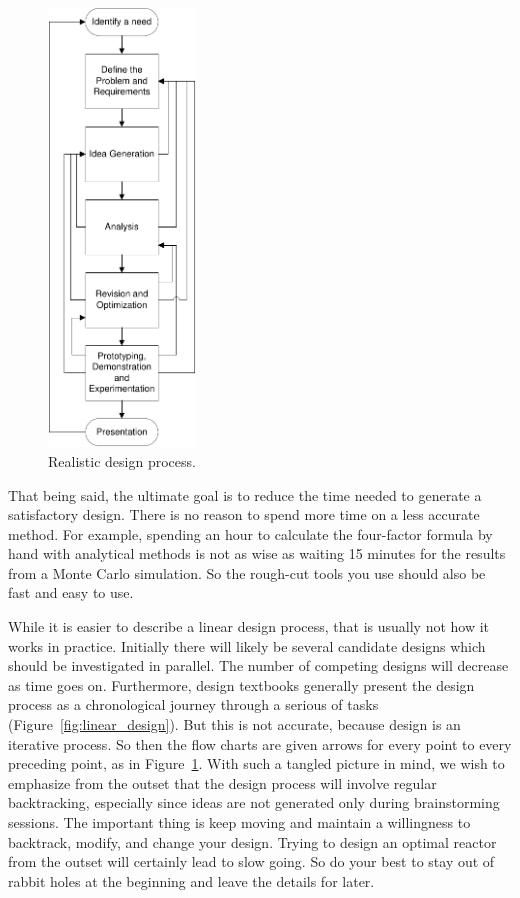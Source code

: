 \begin{figure}
  \label{fig:cluttered_design}
  \centering
  \includegraphics[width=0.35\textwidth]{graphics/GeneralDesignProcess_cluttered.pdf}
  \caption{Realistic design process.}
\end{figure}

That being said, the ultimate goal is to reduce the time needed to generate a satisfactory design. There is no reason to spend more time on a less accurate method. For example, spending an hour to calculate the four-factor formula by hand with analytical methods is not as wise as waiting 15 minutes for the results from a Monte Carlo simulation. So the rough-cut tools you use should also be fast and easy to use.

While it is easier to describe a linear design process, that is usually not how it works in practice. Initially there will likely be several candidate designs which should be investigated in parallel. The number of competing designs will decrease as time goes on. 
Furthermore, design textbooks generally present the design process as a chronological journey through a serious of tasks (Figure~\ref{fig:linear_design}). But this is not accurate, because design is an iterative process. So then the flow charts are given arrows for every point to every preceding point, as in Figure~\ref{fig:cluttered_design}. 
With such a tangled picture in mind, we wish to emphasize from the outset that the design process will involve regular backtracking, especially since ideas are not generated only during brainstorming sessions.
The important thing is keep moving and maintain a willingness to backtrack, modify, and change your design. Trying to design an optimal reactor from the outset will certainly lead to slow going. So do your best to stay out of rabbit holes at the beginning and leave the details for later.


